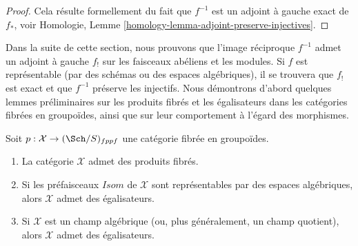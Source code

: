 \begin{proof}
Cela résulte formellement du fait que $f^{-1}$ est un adjoint à gauche
exact de $f_*$, voir
Homologie, Lemme \ref{homology-lemma-adjoint-preserve-injectives}.
\end{proof}

\noindent
Dans la suite de cette section, nous prouvons que l'image réciproque $f^{-1}$ admet un
adjoint à gauche $f_!$ sur les faisceaux abéliens et les modules. Si $f$ est représentable (par
des schémas ou des espaces algébriques), il se trouvera que $f_!$ est exact
et que $f^{-1}$ préserve les injectifs. Nous démontrons d'abord quelques
lemmes préliminaires sur les produits fibrés et les égalisateurs dans les catégories
fibrées en groupoïdes, ainsi que sur leur comportement à l'égard des morphismes.

\begin{lemma}
\label{lemma-fibre-products}
Soit $p : \mathcal{X} \to (\Sch/S)_{fppf}$
une catégorie fibrée en groupoïdes.
\begin{enumerate}
\item La catégorie $\mathcal{X}$ admet des produits fibrés.
\item Si les préfaisceaux $\mathit{Isom}$ de $\mathcal{X}$
sont représentables par des espaces algébriques, alors $\mathcal{X}$ admet des égalisateurs.
\item Si $\mathcal{X}$ est un champ algébrique (ou, plus généralement,
un champ quotient), alors $\mathcal{X}$ admet des égalisateurs.
\end{enumerate}
\end{lemma}


